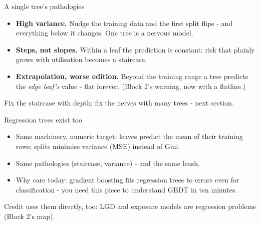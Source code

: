 \documentclass[10pt,aspectratio=169]{beamer}
\begin{document}
\begin{frame}{A single tree's pathologies}
  \begin{itemize}
    \item \textbf{High variance.} Nudge the training data and the first
          split flips - and everything below it changes. One tree is
          a \alert{nervous} model.
    \item \textbf{Steps, not slopes.} Within a leaf the prediction is
          constant: risk that plainly grows with utilisation becomes a
          staircase.
    \item \textbf{Extrapolation, worse edition.} Beyond the training range a
          tree predicts the \emph{edge leaf's} value - flat forever.
          (Block 2's warning, now with a flatline.)
  \end{itemize}
  \vspace{0.5em}
  \begin{center}
    Fix the staircase with depth; fix the nerves with \alert{many trees} -
    next section.
  \end{center}
\end{frame}

\begin{frame}{Regression trees exist too}
  \begin{itemize}
    \item Same machinery, numeric target: leaves predict the \alert{mean} of
          their training rows; splits minimise variance (MSE) instead of Gini.
    \item Same pathologies (staircase, variance) - and the same leash.
    \item Why care today: gradient boosting fits \alert{regression trees to
          errors} even for classification - you need this piece to
          understand GBDT in ten minutes.
  \end{itemize}
  \vspace{0.5em}
  \begin{center}\small
    Credit uses them directly, too: LGD and exposure models are regression
    problems (Block 2's map).
  \end{center}
\end{frame}
\end{document}
